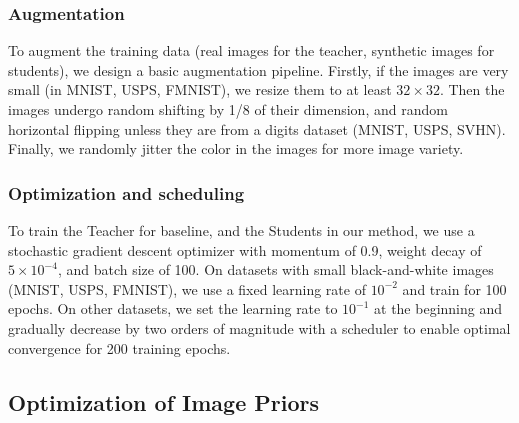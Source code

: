 \subsubsection{Augmentation} \label{sssec:app01-teacherstudents-augment}
\begin{foldable} %
    To augment the training data (real images for the teacher, synthetic images for students), we design a basic augmentation pipeline.
    Firstly, if the images are very small (in MNIST, USPS, FMNIST), we resize them to at least $32\times32$.
    Then the images undergo random shifting by 1/8 of their dimension, and random horizontal flipping unless they are from a digits dataset (MNIST, USPS, SVHN).
    Finally, we randomly jitter the color in the images for more image variety.
\end{foldable}

\subsubsection{Optimization and scheduling} \label{sssec:app01-teacherstudents-optimization}
\begin{foldable} %
    To train the Teacher for baseline, and the Students in our method, we use a stochastic gradient descent optimizer with momentum of 0.9, weight decay of $5\times10^{-4}$, and batch size of 100.
    On datasets with small black-and-white images (MNIST, USPS, FMNIST), we use a fixed learning rate of $10^{-2}$ and train for 100 epochs.
    On other datasets, we set the learning rate to $10^{-1}$ at the beginning and gradually decrease by two orders of magnitude with a scheduler to enable optimal convergence for 200 training epochs.
\end{foldable}


\subsection{Optimization of Image Priors} \label{ssec:app01-imagepriors}
